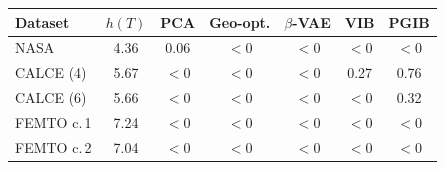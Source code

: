 \begin{tabular}{l c c c c c c}
\hline
Dataset & $h(T)$ & PCA & Geo-opt. & $\beta$-VAE & VIB & PGIB \\
\hline
NASA & 4.36 & 0.06 & $<0$ & $<0$ & $<0$ & $<0$ \\
CALCE (4) & 5.67 & $<0$ & $<0$ & $<0$ & 0.27 & 0.76 \\
CALCE (6) & 5.66 & $<0$ & $<0$ & $<0$ & $<0$ & 0.32 \\
FEMTO c.\,1 & 7.24 & $<0$ & $<0$ & $<0$ & $<0$ & $<0$ \\
FEMTO c.\,2 & 7.04 & $<0$ & $<0$ & $<0$ & $<0$ & $<0$ \\
\hline
\end{tabular}
